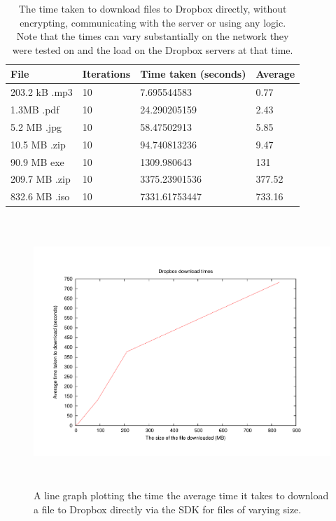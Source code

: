 \documentclass[12pt, titlepage]{article}
\begin{document}
\bigskip
\begin{table}[H]
\begin{center}
    \begin{tabular}{ | l | l | l | l |}
    \hline
    \textbf{File} & \textbf{Iterations} & \textbf{Time taken (seconds)} & \textbf{Average} \\ \hline
    
    203.2 kB .mp3 & 10 & 7.695544583 & 0.77 \\ \hline
    1.3MB .pdf & 10 & 24.290205159 & 2.43 \\ \hline
    5.2 MB .jpg & 10 & 58.47502913 & 5.85 \\ \hline
    10.5 MB .zip & 10 & 94.740813236 & 9.47 \\ \hline
    90.9 MB exe & 10 & 1309.980643 & 131 \\ \hline
    209.7 MB .zip & 10 & 3375.23901536 & 377.52 \\ \hline
    832.6 MB .iso & 10 & 7331.61753447 & 733.16 \\ \hline    
    \end{tabular}
    \caption{The time taken to download files to Dropbox directly, without encrypting, communicating with the server or using any logic. \\ Note that the times can vary substantially on the network they were tested on and the load on the Dropbox servers at that time.} \label{tab:downloadDropboxBenchmark}
    \end{center}
\end{table}

\begin{figure}[H]
\centerline{\includegraphics[height=4.0in,width=7in,angle=0]{plots/dropboxDownload/dropboxDownloadTimes.pdf}}
\caption{A line graph plotting the time the average time it takes to download a file to Dropbox directly via the SDK for files of varying size.}
\label{fig:dropboxDownloadLineGraph}
\end{figure}
\end{document}
